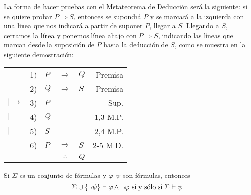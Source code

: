\documentclass[12pt]{report}
\theoremstyle{largebreak}
\begin{document}
    \begin{sol}
        La forma de hacer pruebas con el Metateorema de Deducción será la siguiente: si se quiere probar $P\Rightarrow S$, entonces se supondrá $P$ y se marcará a la izquierda con una linea que nos indicará a partir de suponer $P$, llegar a $S$. Llegando a $S$, cerramos la línea y ponemos línea abajo con $P\Rightarrow S$, indicando las líneas que marcan desde la suposición de $P$ hasta la deducción de $S$, como se muestra en la siguiente demostración:

        \begin{center}
            \begin{tabular}{l r l c l r}
                & 1) & $P$ & $\Rightarrow$ & $Q$ & Premisa \\
                & 2) & $Q$ & $\Rightarrow$ & $S$ & Premisa \\
                $|\longrightarrow$ & 3) & $P$ &  &  & Sup. \\
                $|$ & 4) & $Q$ &  &  & 1,3 M.P. \\
                $|$ & 5) & $S$ &  &  & 2,4 M.P. \\
                \hline
                & 6) & $P$ & $\Rightarrow$ & $S$ & 2-5 M.D.\\
                \hline
                & & & $\therefore$ & $Q$ & \\
            \end{tabular}
        \end{center}
    \end{sol}

    \begin{theor}
        Si $\Sigma$ es un conjunto de fórmulas y $\varphi,\psi$ son fórmulas, entonces
        \begin{equation*}
            \Sigma\cup\left\{\neg\psi \right\}\vdash\varphi\land\neg\varphi\textup{ si y sólo si }\Sigma\vdash\psi
        \end{equation*}
    \end{theor}
\end{document}

